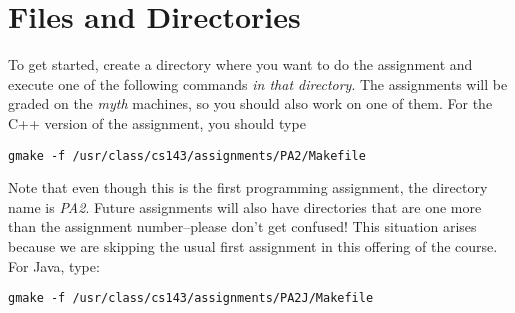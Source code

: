 \documentclass[11pt]{article}
\begin{document}


\section{Files and Directories}

To get started, create a directory where you want to do the assignment
and execute one of the following commands {\em in that directory}.  The
assignments will be graded on the {\em myth} machines, so you should
also work on one of them. For the C++ version of the assignment, you should
type

\begin{verbatim}
gmake -f /usr/class/cs143/assignments/PA2/Makefile
\end{verbatim}

Note that even though this is the first programming assignment, the directory
name is {\em PA2}.  Future assignments will also have directories that are one
more than the assignment number--please don't get confused!  This situation
arises because we are skipping the usual first assignment in this offering
of the course.
\noindent For Java, type:

\begin{verbatim}
gmake -f /usr/class/cs143/assignments/PA2J/Makefile
\end{verbatim}
\end{document}
